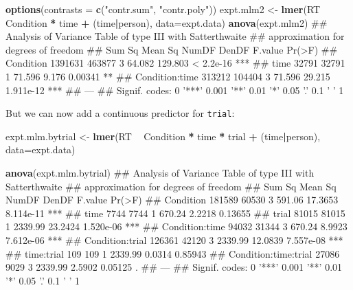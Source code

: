 \documentclass[]{article}
\newenvironment{Shaded}{\begin{snugshade}}{\end{snugshade}}
\newcommand{\KeywordTok}[1]{\textcolor[rgb]{0.13,0.29,0.53}{\textbf{#1}}}
\newcommand{\DataTypeTok}[1]{\textcolor[rgb]{0.13,0.29,0.53}{#1}}
\newcommand{\StringTok}[1]{\textcolor[rgb]{0.31,0.60,0.02}{#1}}
\newcommand{\OperatorTok}[1]{\textcolor[rgb]{0.81,0.36,0.00}{\textbf{#1}}}
\newcommand{\NormalTok}[1]{#1}
\theoremstyle{definition}
\theoremstyle{definition}
\theoremstyle{definition}
\theoremstyle{remark}
\begin{document}
\begin{Shaded}
\begin{Highlighting}[]
\KeywordTok{options}\NormalTok{(}\DataTypeTok{contrasts =} \KeywordTok{c}\NormalTok{(}\StringTok{"contr.sum"}\NormalTok{, }\StringTok{"contr.poly"}\NormalTok{))}
\NormalTok{expt.mlm2 <-}\StringTok{ }\KeywordTok{lmer}\NormalTok{(RT }\OperatorTok{~}\StringTok{ }\NormalTok{Condition }\OperatorTok{*}\StringTok{ }\NormalTok{time }\OperatorTok{+}\StringTok{ }\NormalTok{(time}\OperatorTok{|}\NormalTok{person), }\DataTypeTok{data=}\NormalTok{expt.data)}
\KeywordTok{anova}\NormalTok{(expt.mlm2)}
\NormalTok{## Analysis of Variance Table of type III  with  Satterthwaite }
\NormalTok{## approximation for degrees of freedom}
\NormalTok{##                 Sum Sq Mean Sq NumDF  DenDF F.value    Pr(>F)    }
\NormalTok{## Condition      1391631  463877     3 64.082 129.803 < 2.2e-16 ***}
\NormalTok{## time             32791   32791     1 71.596   9.176   0.00341 ** }
\NormalTok{## Condition:time  313212  104404     3 71.596  29.215 1.911e-12 ***}
\NormalTok{## ---}
\NormalTok{## Signif. codes:  0 '***' 0.001 '**' 0.01 '*' 0.05 '.' 0.1 ' ' 1}
\end{Highlighting}
\end{Shaded}

But we can now add a continuous predictor for \texttt{trial}:

\begin{Shaded}
\begin{Highlighting}[]
\NormalTok{expt.mlm.bytrial <-}\StringTok{ }\KeywordTok{lmer}\NormalTok{(RT }\OperatorTok{~}\StringTok{ }\NormalTok{Condition }\OperatorTok{*}\StringTok{ }\NormalTok{time }\OperatorTok{*}\StringTok{ }\NormalTok{trial }\OperatorTok{+}\StringTok{ }
\StringTok{    }\NormalTok{(time}\OperatorTok{|}\NormalTok{person), }
    \DataTypeTok{data=}\NormalTok{expt.data)}

\KeywordTok{anova}\NormalTok{(expt.mlm.bytrial)}
\NormalTok{## Analysis of Variance Table of type III  with  Satterthwaite }
\NormalTok{## approximation for degrees of freedom}
\NormalTok{##                      Sum Sq Mean Sq NumDF   DenDF F.value    Pr(>F)    }
\NormalTok{## Condition            181589   60530     3  591.06 17.3653 8.114e-11 ***}
\NormalTok{## time                   7744    7744     1  670.24  2.2218   0.13655    }
\NormalTok{## trial                 81015   81015     1 2339.99 23.2424 1.520e-06 ***}
\NormalTok{## Condition:time        94032   31344     3  670.24  8.9923 7.612e-06 ***}
\NormalTok{## Condition:trial      126361   42120     3 2339.99 12.0839 7.557e-08 ***}
\NormalTok{## time:trial              109     109     1 2339.99  0.0314   0.85943    }
\NormalTok{## Condition:time:trial  27086    9029     3 2339.99  2.5902   0.05125 .  }
\NormalTok{## ---}
\NormalTok{## Signif. codes:  0 '***' 0.001 '**' 0.01 '*' 0.05 '.' 0.1 ' ' 1}
\end{Highlighting}
\end{Shaded}
\end{document}
